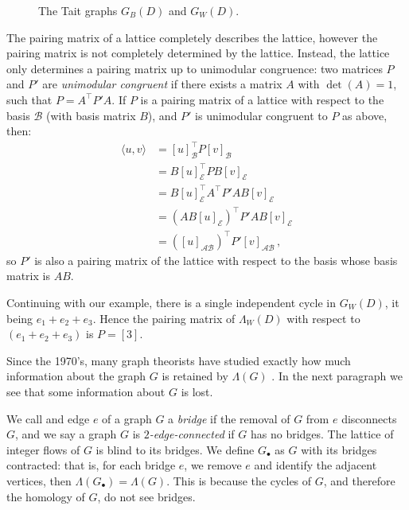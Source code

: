 \documentclass[12pt]{report}
\theoremstyle{upright}
\begin{document}
\begin{figure}[hbt]
	\centering
	\def\svgscale{0.4}
	
	\caption{The Tait graphs $G_{B}(D)$ and $G_{W}(D)$.}
	\label{fig:trefoil-abstract-tait}
\end{figure}

The pairing matrix of a lattice completely describes the lattice, however the pairing matrix is not completely determined by the lattice. Instead, the lattice only determines a pairing matrix up to unimodular congruence: two matrices $P$ and $P'$ are \textit{unimodular congruent} if there exists a matrix $A$ with $\det(A) = 1$, such that $P = A^{\top}P'A$. If $P$ is a pairing matrix of a lattice with respect to the basis $\mathcal{B}$ (with basis matrix $B$), and $P'$ is unimodular congruent to $P$ as above, then:
\begin{align*}
	\langle u, v \rangle & = [u]_{\mathcal{B}}^{\top} P [v]_{\mathcal{B}}                    \\
	                     & = B[u]_{\mathcal{E}}^{\top} P B[v]_{\mathcal{E}}                  \\
	                     & = B[u]_{\mathcal{E}}^{\top} A^{\top} P' A B[v]_{\mathcal{E}}      \\
	                     & = \left( AB[u]_{\mathcal{E}} \right)^{\top} P' AB[v]_{\mathcal{E}} \\
	                     & = \left( [u]_{\mathcal{AB}} \right)^{\top} P' [v]_{\mathcal{AB}}\,,
\end{align*}
so $P'$ is also a pairing matrix of the lattice with respect to the basis whose basis matrix is $AB$.


Continuing with our example, there is a single independent cycle in $G_{W}(D)$, it being $e_{1} + e_{2} + e_{3}$. Hence the pairing matrix of $\Lambda_{W}(D)$ with respect to $( e_{1} + e_{2} + e_{3})$ is $P = [3]$.

Since the 1970's, many graph theorists have studied exactly how much information about the graph $G$ is retained by $\Lambda(G)$ \parencite{lattice-of-flows-cuts, torelli-for-graphs-tropical-curves, lattice-of-flows-regular-matroid}. In the next paragraph we see that some information about $G$ is lost.

We call and edge $e$ of a graph $G$ a \textit{bridge} if the removal of $G$ from $e$ disconnects $G$, and we say a graph $G$ is \textit{$2$-edge-connected} if $G$ has no bridges. The lattice of integer flows of $G$ is blind to its bridges. We define $G_{\bullet}$ as $G$ with its bridges contracted: that is, for each bridge $e$, we remove $e$ and identify the adjacent vertices, then $\Lambda(G_{\bullet}) = \Lambda(G)$. This is because the cycles of $G$, and therefore the homology of $G$, do not see bridges.
\end{document}
